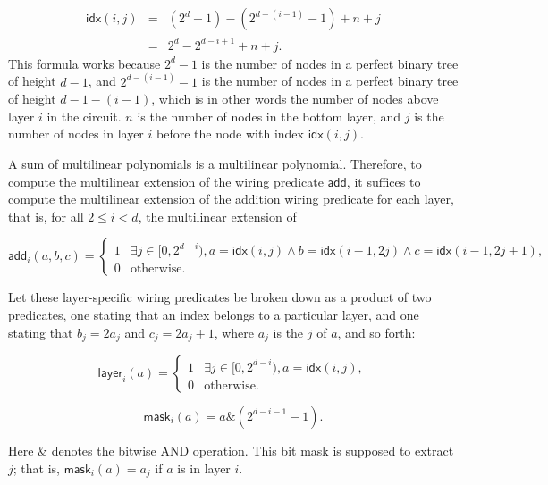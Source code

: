 \documentclass[11pt]{article}
\begin{document}
\begin{equation}
	\begin{array}{rcl}
		\mathsf{idx}(i, j) &=& (2^d-1) - (2^{d-(i-1)}-1) + n + j \\
		&=& 2^d - 2^{d-i+1} + n + j.
	\end{array}
\end{equation}
This formula works because $2^d-1$ is the number of nodes in a perfect binary tree of height $d-1$,
and $2^{d-(i-1)}-1$ is the number of nodes in a perfect binary tree of height $d-1-(i-1)$, which is
in other words the number of nodes above layer $i$ in the circuit. $n$ is the number of nodes in
the bottom layer, and $j$ is the number of nodes in layer $i$ before the node with index
$\mathsf{idx}(i, j)$.

A sum of multilinear polynomials is a multilinear polynomial. Therefore, to compute the multilinear
extension of the wiring predicate $\mathsf{add}$, it suffices to compute the multilinear extension
of the addition wiring predicate for each layer, that is, for all $2 \leq i < d$, the multilinear
extension of

\begin{equation}
	\mathsf{add}_i(a, b, c) =
	\begin{cases}
		1 & \exists j \in [0,2^{d-i}), a = \mathsf{idx}(i, j) \wedge b = \mathsf{idx}(i-1, 2j) \wedge c = \mathsf{idx}(i-1, 2j+1), \\
		0 & \text{otherwise}.
	\end{cases}
\end{equation}

Let these layer-specific wiring predicates be broken down as a product of two predicates, one
stating that an index belongs to a particular layer, and one stating that $b_j = 2a_j$ and $c_j = 2a_j + 1$,
where $a_j$ is the $j$ of $a$, and so forth:

\begin{equation}
	\mathsf{layer}_i(a) =
	\begin{cases}
		1 & \exists j \in [0,2^{d-i}), a = \mathsf{idx}(i, j), \\
		0 & \text{otherwise}.
	\end{cases}
\end{equation}

\begin{equation}
	\mathsf{mask}_i(a) = a \text{\&} (2^{d-i-1}-1).
\end{equation}

Here \& denotes the bitwise AND operation. This bit mask is supposed to extract $j$;
that is, $\mathsf{mask}_i(a) = a_j$ if $a$ is in layer $i$.
\end{document}
